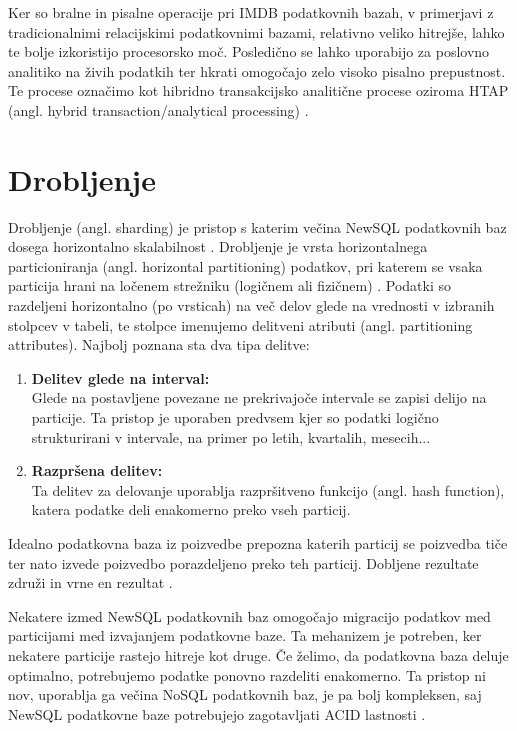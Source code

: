 \documentclass[a4paper, 12pt]{book}
\begin{document}
Ker so bralne in pisalne operacije pri IMDB podatkovnih bazah, v primerjavi z tradicionalnimi relacijskimi podatkovnimi bazami, relativno veliko hitrejše, lahko te bolje izkoristijo procesorsko moč. Posledično se lahko uporabijo za poslovno analitiko na živih podatkih ter hkrati omogočajo zelo visoko pisalno prepustnost. Te procese označimo kot hibridno transakcijsko analitične procese oziroma HTAP (angl. hybrid transaction/analytical processing) \cite{NewSqlInMemoryAnalytics}.


\section{Drobljenje}
Drobljenje (angl. sharding) je pristop s katerim večina NewSQL podatkovnih baz dosega horizontalno skalabilnost \cite{Pavlo2016Sep}. Drobljenje je vrsta horizontalnega particioniranja (angl. horizontal partitioning) podatkov, pri katerem se vsaka particija hrani na ločenem strežniku (logičnem ali fizičnem) \cite{WikiSharding}. Podatki so razdeljeni horizontalno (po vrsticah) na več delov glede na vrednosti v izbranih stolpcev v tabeli, te stolpce imenujemo delitveni atributi (angl. partitioning attributes). Najbolj poznana sta dva tipa delitve:

\begin{enumerate}
    \item \textbf{Delitev glede na interval:}\\Glede na postavljene povezane ne prekrivajoče intervale se zapisi delijo na particije. Ta pristop je uporaben predvsem kjer so podatki logično strukturirani v intervale, na primer po letih, kvartalih, mesecih...
    \item \textbf{Razpršena delitev:}\\Ta delitev za delovanje uporablja razpršitveno funkcijo (angl. hash function), katera podatke deli enakomerno preko vseh particij.
\end{enumerate}

Idealno podatkovna baza iz poizvedbe prepozna katerih particij se poizvedba tiče ter nato izvede poizvedbo porazdeljeno preko teh particij. Dobljene rezultate združi in vrne en rezultat \cite{Pavlo2016Sep}.

Nekatere izmed NewSQL podatkovnih baz omogočajo migracijo podatkov med particijami med izvajanjem podatkovne baze. Ta mehanizem je potreben, ker nekatere particije rastejo hitreje kot druge. Če želimo, da podatkovna baza deluje optimalno, potrebujemo podatke ponovno razdeliti enakomerno. Ta pristop ni nov, uporablja ga večina NoSQL podatkovnih baz, je pa bolj kompleksen, saj NewSQL podatkovne baze 
potrebujejo zagotavljati ACID lastnosti \cite{Pavlo2016Sep}.
\end{document}
